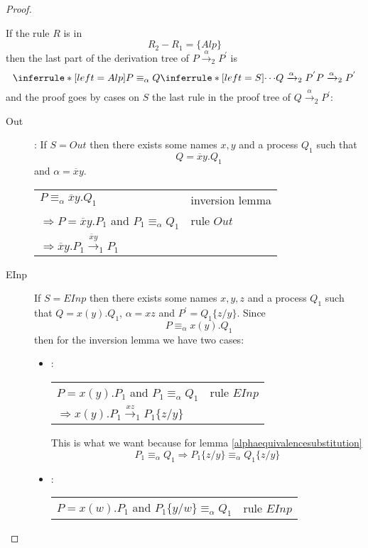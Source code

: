 \begin{theorem}
\begin{proof}
\begin{description}
	If the rule $R$ is in 
	\[
	  R_{2}-R_{1}=\{Alp\}
	\]
	then the last part of the derivation tree of $P\xrightarrow{\alpha}_{2}P^{'}$ is
	\[
	  \inferrule* [left=Alp]{
	      P\equiv_{\alpha}Q
	    \\
	      \inferrule* [left=S]{
		\cdots
	      }{
		Q\xrightarrow{\alpha}_{2}P^{'}
	      }
	  }{
	    P\xrightarrow{\alpha}_{2}P^{'}
	  }
	\]
	and the proof goes by cases on $S$ the last rule in the proof tree of $Q\xrightarrow{\alpha}_{2}P^{'}$:
	\begin{description}
	  \item[Out]:
	    If $S=Out$ then there exists some names $x,y$ and a process $Q_{1}$ such that 
	    \[
	      Q=\overline{x}y.Q_{1}
	    \]
	    and $\alpha=\overline{x}y$. 
 	    \begin{center}
 	      \begin{tabular}{ll}
 		$P\equiv_{\alpha}\overline{x}y.Q_{1}$&inversion lemma\\
 		$\Rightarrow P=\overline{x}y.P_{1}$ and $P_{1}\equiv_{\alpha}Q_{1}$&rule $Out$\\
 		$\Rightarrow \overline{x}y.P_{1}\xrightarrow{\overline{x}y}_{1}P_{1}$&\\
 	      \end{tabular}
 	    \end{center}
	  \item[EInp]
	    If $S=EInp$ then there exists some names $x,y,z$ and a process $Q_{1}$ such that $Q=x(y).Q_{1}$, $\alpha=xz$ and $P^{'}=Q_{1}\{z/y\}$. Since 
	    \[
	      P\equiv_{\alpha}x(y).Q_{1}
	    \]
	    then for the inversion lemma we have two cases:
	    \begin{itemize}
	      \item 
		:
		\begin{center}
		  \begin{tabular}{ll}
		    $P=x(y).P_{1}$ and $P_{1}\equiv_{\alpha}Q_{1}$& rule $EInp$\\
		    $\Rightarrow x(y).P_{1}\xrightarrow{xz}_{1}P_{1}\{z/y\}$& \\
		  \end{tabular}
		\end{center}
		This is what we want because for lemma \ref{alphaequivalencesubstitution}
		\[
		  P_{1}\equiv_{\alpha}Q_{1}\Rightarrow P_{1}\{z/y\}\equiv_{\alpha}Q_{1}\{z/y\}
		\]
	      \item
		:
		\begin{center}
		  \begin{tabular}{ll}
		    $P=x(w).P_{1}$ and $P_{1}\{y/w\}\equiv_{\alpha}Q_{1}$& rule $EInp$\\

\end{tabular}
\end{center}
\end{itemize}
\end{description}
\end{description}
\end{proof}
\end{theorem}
